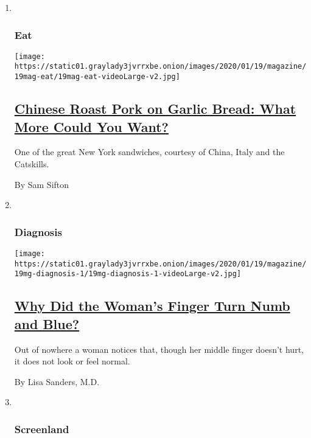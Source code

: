 \begin{enumerate}
\def\labelenumi{\arabic{enumi}.}
\item ~
  \hypertarget{eat}{%
  \subsubsection{Eat}\label{eat}}

  \texttt{[image: https://static01.graylady3jvrrxbe.onion/images/2020/01/19/magazine/19mag-eat/19mag-eat-videoLarge-v2.jpg]}

  \hypertarget{chinese-roast-pork-on-garlic-bread-what-more-could-you-want}{%
  \subsection{\texorpdfstring{\href{/2020/01/15/magazine/chinese-roast-pork-garlic-bread-recipe.html}{Chinese
  Roast Pork on Garlic Bread: What More Could You
  Want?}}{Chinese Roast Pork on Garlic Bread: What More Could You Want?}}\label{chinese-roast-pork-on-garlic-bread-what-more-could-you-want}}

  One of the great New York sandwiches, courtesy of China, Italy and the
  Catskills.

  By Sam Sifton
\item ~
  \hypertarget{diagnosis}{%
  \subsubsection{Diagnosis}\label{diagnosis}}

  \texttt{[image: https://static01.graylady3jvrrxbe.onion/images/2020/01/19/magazine/19mg-diagnosis-1/19mg-diagnosis-1-videoLarge-v2.jpg]}

  \hypertarget{why-did-the-womans-finger-turn-numb-and-blue}{%
  \subsection{\texorpdfstring{\href{/2020/01/15/magazine/why-did-the-womans-finger-turn-numb-and-blue.html}{Why
  Did the Woman's Finger Turn Numb and
  Blue?}}{Why Did the Woman's Finger Turn Numb and Blue?}}\label{why-did-the-womans-finger-turn-numb-and-blue}}

  Out of nowhere a woman notices that, though her middle finger doesn't
  hurt, it does not look or feel normal.

  By Lisa Sanders, M.D.
\item ~
  \hypertarget{screenland}{%
  \subsubsection{Screenland}\label{screenland}}


\end{enumerate}
